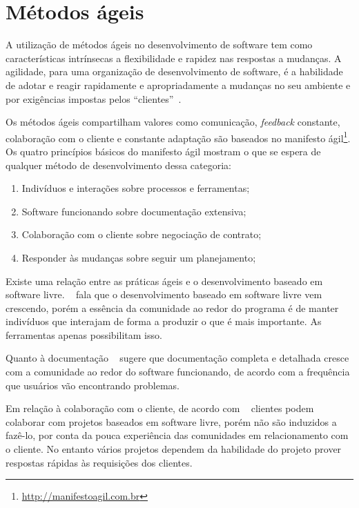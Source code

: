
\section{Métodos ágeis}
\label{metodos-ageis}

A utilização de métodos ágeis no desenvolvimento de software tem como características 
intrínsecas a flexibilidade e rapidez nas respostas a mudanças. 
%
A agilidade, para uma organização de desenvolvimento de software, é a habilidade 
de adotar e reagir rapidamente e apropriadamente a mudanças no seu ambiente e por 
exigências impostas pelos ``clientes''~\cite{nerur2005}.
 	
Os métodos ágeis compartilham valores como comunicação, \emph{feedback} constante, colaboração com o cliente e constante adaptação são baseados no manifesto ágil\footnote{\url{http://manifestoagil.com.br}}. Os quatro princípios básicos do manifesto ágil mostram o que se espera de qualquer método de desenvolvimento dessa categoria:
%
\begin{enumerate}
\item Indivíduos  e interações sobre processos e ferramentas;
\item Software funcionando sobre documentação extensiva;
\item Colaboração com o cliente sobre negociação de contrato;
\item Responder às  mudanças sobre seguir um planejamento;
\end{enumerate}

Existe uma relação entre as práticas ágeis e o desenvolvimento baseado em software livre. ~ fala que o desenvolvimento baseado em software livre vem crescendo, porém a essência da comunidade ao redor do programa é de manter indivíduos que interajam de forma a produzir o que é mais importante. As ferramentas apenas possibilitam isso. 

Quanto à documentação ~ sugere que documentação completa e detalhada cresce com a comunidade ao redor do software funcionando, de acordo com a frequência que usuários vão encontrando problemas.

Em relação à colaboração com o cliente, de acordo com ~ clientes podem colaborar com projetos baseados em software livre, porém não são induzidos a fazê-lo, por conta da pouca experiência das comunidades em relacionamento com o cliente. No entanto vários projetos dependem da habilidade do projeto prover respostas rápidas às requisições dos clientes.

